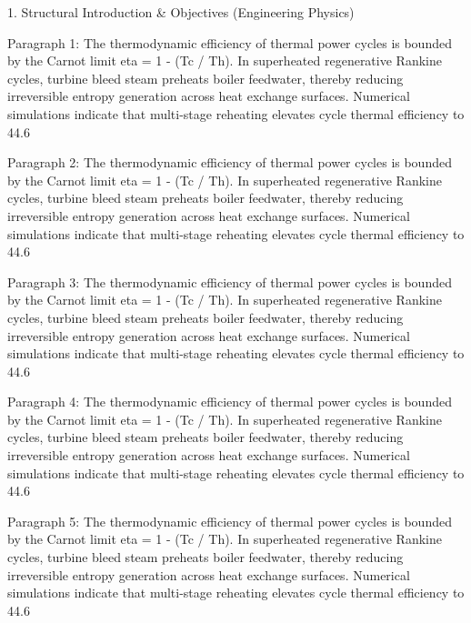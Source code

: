 1. Structural Introduction & Objectives (Engineering Physics)


Paragraph 1: The thermodynamic efficiency of thermal power cycles is bounded by the Carnot limit eta = 1 - (Tc / Th). In superheated regenerative Rankine cycles, turbine bleed steam preheats boiler feedwater, thereby reducing irreversible entropy generation across heat exchange surfaces. Numerical simulations indicate that multi-stage reheating elevates cycle thermal efficiency to 44.6%

Paragraph 2: The thermodynamic efficiency of thermal power cycles is bounded by the Carnot limit eta = 1 - (Tc / Th). In superheated regenerative Rankine cycles, turbine bleed steam preheats boiler feedwater, thereby reducing irreversible entropy generation across heat exchange surfaces. Numerical simulations indicate that multi-stage reheating elevates cycle thermal efficiency to 44.6%

Paragraph 3: The thermodynamic efficiency of thermal power cycles is bounded by the Carnot limit eta = 1 - (Tc / Th). In superheated regenerative Rankine cycles, turbine bleed steam preheats boiler feedwater, thereby reducing irreversible entropy generation across heat exchange surfaces. Numerical simulations indicate that multi-stage reheating elevates cycle thermal efficiency to 44.6%

Paragraph 4: The thermodynamic efficiency of thermal power cycles is bounded by the Carnot limit eta = 1 - (Tc / Th). In superheated regenerative Rankine cycles, turbine bleed steam preheats boiler feedwater, thereby reducing irreversible entropy generation across heat exchange surfaces. Numerical simulations indicate that multi-stage reheating elevates cycle thermal efficiency to 44.6%

Paragraph 5: The thermodynamic efficiency of thermal power cycles is bounded by the Carnot limit eta = 1 - (Tc / Th). In superheated regenerative Rankine cycles, turbine bleed steam preheats boiler feedwater, thereby reducing irreversible entropy generation across heat exchange surfaces. Numerical simulations indicate that multi-stage reheating elevates cycle thermal efficiency to 44.6%


